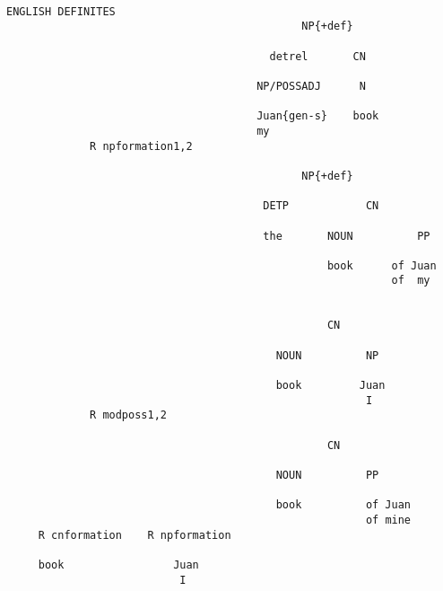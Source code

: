 \newpage
\begin{verbatim}

ENGLISH DEFINITES
                                              NP{+def}

                                         detrel       CN

                                       NP/POSSADJ      N

                                       Juan{gen-s}    book
                                       my
             R npformation1,2

                                              NP{+def}

                                        DETP            CN

                                        the       NOUN          PP

                                                  book      of Juan
                                                            of  my


                                                  CN
                                            
                                          NOUN          NP

                                          book         Juan              
                                                        I
             R modposs1,2

                                                  CN

                                          NOUN          PP

                                          book          of Juan
                                                        of mine
     R cnformation    R npformation

     book                 Juan                           
                           I
\end{verbatim}
\newpage

